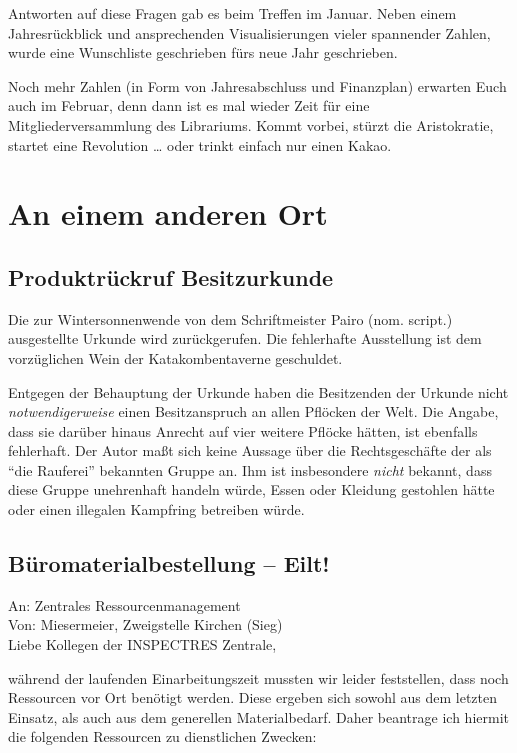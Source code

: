 Antworten auf diese Fragen gab es beim Treffen im Januar.
Neben einem Jahresrückblick und ansprechenden Visualisierungen vieler spannender Zahlen, wurde eine Wunschliste geschrieben fürs neue Jahr geschrieben.

Noch mehr Zahlen (in Form von Jahresabschluss und Finanzplan) erwarten Euch auch im Februar, denn dann ist es mal wieder Zeit für eine Mitgliederversammlung des Librariums.
Kommt vorbei, stürzt die Aristokratie, startet eine Revolution … oder trinkt einfach nur einen Kakao.


\section{An einem anderen Ort}


\subsection{Produktrückruf Besitzurkunde}
Die zur Wintersonnenwende von dem Schriftmeister Pairo (nom. script.) ausgestellte Urkunde wird zurückgerufen.
Die fehlerhafte Ausstellung ist dem vorzüglichen Wein der Katakombentaverne geschuldet.

Entgegen der Behauptung der Urkunde haben die Besitzenden der Urkunde nicht \textit{notwendigerweise} einen Besitzanspruch an allen Pflöcken der Welt.
Die Angabe, dass sie darüber hinaus Anrecht auf vier weitere Pflöcke hätten, ist ebenfalls fehlerhaft.
Der Autor maßt sich keine Aussage über die Rechtsgeschäfte der als \enquote{die Rauferei} bekannten Gruppe an.
Ihm ist insbesondere \textit{nicht} bekannt, dass diese Gruppe unehrenhaft handeln würde, Essen oder Kleidung gestohlen hätte oder einen illegalen Kampfring betreiben würde.


\subsection{Büromaterialbestellung -- Eilt!}
An: Zentrales Ressourcenmanagement \\
Von: Miesermeier, Zweigstelle Kirchen (Sieg) \\

\noindent
Liebe Kollegen der INSPECTRES Zentrale,

während der laufenden Einarbeitungszeit mussten wir leider feststellen, dass noch Ressourcen vor Ort benötigt werden.
Diese ergeben sich sowohl aus dem letzten Einsatz, als auch aus dem generellen Materialbedarf.
Daher beantrage ich hiermit die folgenden Ressourcen zu dienstlichen Zwecken:

